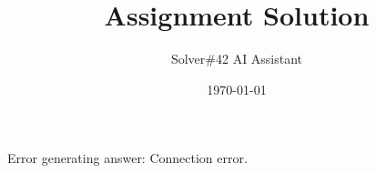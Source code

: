\documentclass{beamer}
\title{Assignment Solution}
\author{Solver\#42 AI Assistant}
\date{\today}
\begin{document}
\frame{\titlepage}

Error generating answer: Connection error.
\end{document}
